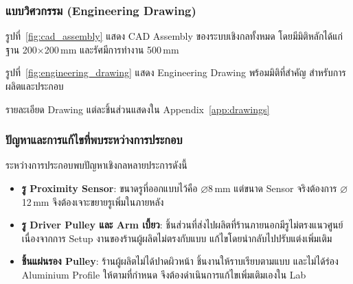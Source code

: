 
\subsubsection{แบบวิศวกรรม (Engineering Drawing)}
\label{subsubsec:engineering_drawing}

รูปที่~\ref{fig:cad_assembly} แสดง CAD Assembly
ของระบบเชิงกลทั้งหมด โดยมีมิติหลักได้แก่
ฐาน 200$\times$200\,mm และรัศมีการทำงาน 500\,mm


รูปที่~\ref{fig:engineering_drawing} แสดง
Engineering Drawing พร้อมมิติที่สำคัญ
สำหรับการผลิตและประกอบ


รายละเอียด Drawing แต่ละชิ้นส่วนแสดงใน
Appendix~\ref{app:drawings}

\subsubsection{ปัญหาและการแก้ไขที่พบระหว่างการประกอบ}
\label{subsubsec:assembly_issues}

ระหว่างการประกอบพบปัญหาเชิงกลหลายประการดังนี้

\begin{itemize}
  \item \textbf{รู Proximity Sensor}: ขนาดรูที่ออกแบบไว้คือ
        $\diameter$8\,mm แต่ขนาด Sensor จริงต้องการ $\diameter$12\,mm
        จึงต้องเจาะขยายรูเพิ่มในภายหลัง
  \item \textbf{รู Driver Pulley และ Arm เบี้ยว}:
        ชิ้นส่วนที่ส่งไปผลิตที่ร้านภายนอกมีรูไม่ตรงแนวศูนย์
        เนื่องจากการ Setup งานของร้านผู้ผลิตไม่ตรงกับแบบ
        แก้ไขโดยนำกลับไปปรับแต่งเพิ่มเติม
  \item \textbf{ชิ้นแผ่นรอง Pulley}: ร้านผู้ผลิตไม่ได้ปาดผิวหน้า
        ชิ้นงานให้ราบเรียบตามแบบ และไม่ได้ร่อง Aluminium Profile
        ให้ตามที่กำหนด จึงต้องดำเนินการแก้ไขเพิ่มเติมเองใน Lab
\end{itemize}

